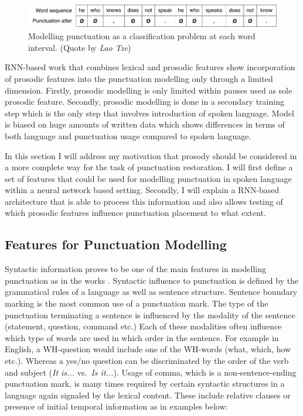\begin{figure}[h]
\centering\includegraphics[width=\linewidth]{img/he_who_knows.pdf}
\caption{Modelling punctuation as a classification problem at each word interval. (Quote by \textit{Lao Tze})}
\label{punkProse:figure:he_who_knows}
\end{figure}

RNN-based work that combines lexical and prosodic features \citep{tilk2015lstm, tilk2016bidirectional} show incorporation of prosodic features into the punctuation modelling only through a limited dimension. Firstly, prosodic modelling is only limited within pauses used as sole prosodic feature. Secondly, prosodic modelling is done in a secondary training step which is the only step that involves introduction of spoken language. Model is biased on huge amounts of written data which shows differences in terms of both language and punctuation usage compared to spoken language. 

In this section I will address my motivation that prosody should be considered in a more complete way for the task of punctuation restoration. I will first define a set of features that could be used for modelling punctuation in spoken language within a neural network based setting. Secondly, I will explain a RNN-based architecture that is able to process this information and also allows testing of which prosodic features influence punctuation placement to what extent. 

\subsection{Features for Punctuation Modelling}
\label{punkProse:methodology:features}

Syntactic information proves to be one of the main features in modelling punctuation as in the works \cite{Che2016PunctuationPF, batista2012bilingual, ballesterosneural}. Syntactic influence to punctuation is defined by the grammatical rules of a language as well as sentence structure. Sentence boundary marking is the most common use of a punctuation mark. The type of the punctuation terminating a sentence is influenced by the modality of the sentence (statement, question, command etc.) Each of these modalities often influence which type of words are used in which order in the sentence. For example in English, a WH-question would include one of the WH-words (what, which, how etc.). Whereas a yes/no question can be discriminated by the order of the verb and subject (\textit{It is...} vs.~\textit{Is it...}). Usage of comma, which is a non-sentence-ending punctuation mark, is many times required by certain syntactic structures in a language again signaled by the lexical content. These include relative clauses or presence of initial temporal information as in examples below:


